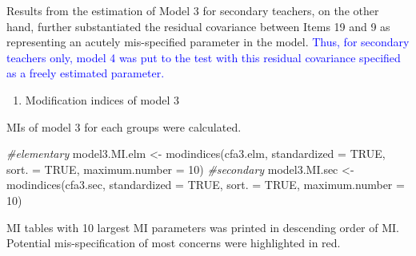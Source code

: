 \documentclass[
]{article}
\newenvironment{Shaded}{\begin{snugshade}}{\end{snugshade}}
\newcommand{\AttributeTok}[1]{\textcolor[rgb]{0.77,0.63,0.00}{#1}}
\newcommand{\CommentTok}[1]{\textcolor[rgb]{0.56,0.35,0.01}{\textit{#1}}}
\newcommand{\ConstantTok}[1]{\textcolor[rgb]{0.00,0.00,0.00}{#1}}
\newcommand{\DecValTok}[1]{\textcolor[rgb]{0.00,0.00,0.81}{#1}}
\newcommand{\FunctionTok}[1]{\textcolor[rgb]{0.00,0.00,0.00}{#1}}
\newcommand{\NormalTok}[1]{#1}
\newcommand{\OtherTok}[1]{\textcolor[rgb]{0.56,0.35,0.01}{#1}}
\providecommand{\tightlist}{%
  \setlength{\itemsep}{0pt}\setlength{\parskip}{0pt}}
\begin{document}
Results from the estimation of Model 3 for secondary teachers, on the other hand, further substantiated the residual covariance between Items 19 and 9 as representing an acutely mis-specified parameter in the model. \textcolor{blue}{Thus, for secondary teachers only, model 4 was put to the test with this residual covariance specified as a freely estimated parameter.}

\begin{enumerate}
\def\labelenumi{(\arabic{enumi})}
\setcounter{enumi}{1}
\tightlist
\item
  Modification indices of model 3
\end{enumerate}

MIs of model 3 for each groups were calculated.

\begin{Shaded}
\begin{Highlighting}[]
\CommentTok{\#elementary}
\NormalTok{model3.MI.elm }\OtherTok{\textless{}{-}} 
  \FunctionTok{modindices}\NormalTok{(cfa3.elm,}
             \AttributeTok{standardized =} \ConstantTok{TRUE}\NormalTok{,}
             \AttributeTok{sort. =} \ConstantTok{TRUE}\NormalTok{,}
             \AttributeTok{maximum.number =} \DecValTok{10}\NormalTok{)}
\CommentTok{\#secondary}
\NormalTok{model3.MI.sec }\OtherTok{\textless{}{-}} 
  \FunctionTok{modindices}\NormalTok{(cfa3.sec,}
             \AttributeTok{standardized =} \ConstantTok{TRUE}\NormalTok{,}
             \AttributeTok{sort. =} \ConstantTok{TRUE}\NormalTok{,}
             \AttributeTok{maximum.number =} \DecValTok{10}\NormalTok{)}
\end{Highlighting}
\end{Shaded}

MI tables with 10 largest MI parameters was printed in descending order of MI. Potential mis-specification of most concerns were highlighted in red.
\end{document}
